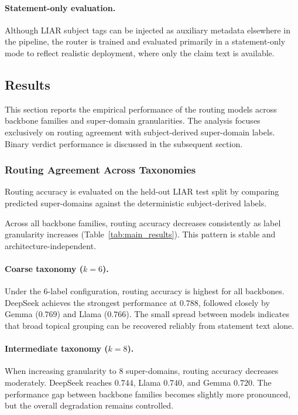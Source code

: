 \paragraph{Statement-only evaluation.}
Although LIAR subject tags can be injected as auxiliary metadata elsewhere in the pipeline, the router is trained and evaluated primarily in a statement-only mode to reflect realistic deployment, where only the claim text is available.

\subsection{Results}

This section reports the empirical performance of the routing models across backbone families and super-domain granularities. The analysis focuses exclusively on routing agreement with subject-derived super-domain labels. Binary verdict performance is discussed in the subsequent section.

\subsubsection{Routing Agreement Across Taxonomies}

Routing accuracy is evaluated on the held-out LIAR test split by comparing predicted super-domains against the deterministic subject-derived labels.

Across all backbone families, routing accuracy decreases consistently as label granularity increases (Table~\ref{tab:main_results}). This pattern is stable and architecture-independent.

\paragraph{Coarse taxonomy ($k=6$).}
Under the 6-label configuration, routing accuracy is highest for all backbones. DeepSeek achieves the strongest performance at $0.788$, followed closely by Gemma ($0.769$) and Llama ($0.766$). The small spread between models indicates that broad topical grouping can be recovered reliably from statement text alone.

\paragraph{Intermediate taxonomy ($k=8$).}
When increasing granularity to 8 super-domains, routing accuracy decreases moderately. DeepSeek reaches $0.744$, Llama $0.740$, and Gemma $0.720$. The performance gap between backbone families becomes slightly more pronounced, but the overall degradation remains controlled.

